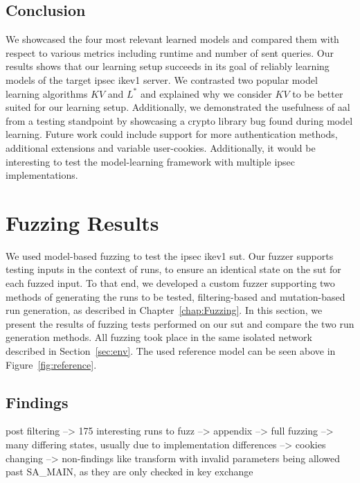 \subsection{Conclusion} 
We showcased the four most relevant learned models and compared them with respect to various metrics including runtime and number of sent queries. Our results shows that our learning setup succeeds in its goal of reliably learning models of the target \ac{ipsec} \ac{ike}v1 server. We contrasted two popular model learning algorithms $KV$ and $L^*$ and explained why we consider $KV$ to be better suited for our learning setup. Additionally, we demonstrated the usefulness of \ac{aal} from a testing standpoint by showcasing a crypto library bug found during model learning. Future work could include support for more authentication methods, additional extensions and variable user-cookies. Additionally, it would be interesting to test the model-learning framework with multiple \ac{ipsec} implementations.

\section{Fuzzing Results} \label{sec:fuzzresults}
We used model-based fuzzing to test the \ac{ipsec} \ac{ike}v1 \ac{sut}. Our fuzzer supports testing inputs in the context of runs, to ensure an identical state on the \ac{sut} for each fuzzed input. To that end, we developed a custom fuzzer supporting two methods of generating the runs to be tested, filtering-based and mutation-based run generation, as described in Chapter~\ref{chap:Fuzzing}. In this section, we present the results of fuzzing tests performed on our \ac{sut} and compare the two run generation methods. All fuzzing took place in the same isolated network described in Section~\ref{sec:env}. The used reference model can be seen above in Figure~\ref{fig:reference}.

\subsection{Findings} \label{subsec:findings}
post filtering --> 175 interesting runs to fuzz --> appendix
--> full fuzzing --> many differing states, usually due to implementation differences --> cookies changing
--> non-findings like transform with invalid parameters being allowed past SA\_MAIN, as they are only checked in key exchange


